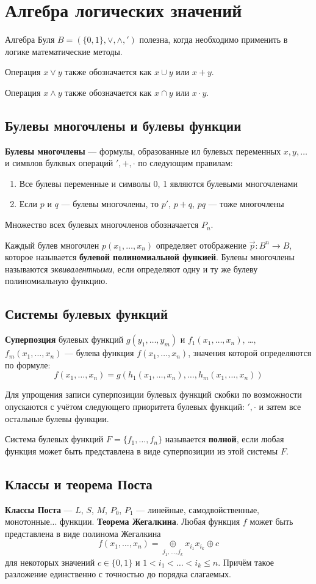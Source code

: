 \section{Алгебра логических значений}
Алгебра Буля $B = (\{0, 1\}, \lor, \land, ')$ полезна, когда необходимо применить в логике математические методы.

Операция $x \lor y$ также обозначается как $x \cup y$ или $x + y$.

Операция $x \land y$ также обозначается как $x \cap y$ или $x \cdot y$.

\subsection{Булевы многочлены и булевы функции}
\dftion \textbf{Булевы многочлены} --- формулы, образованные ил булевых переменных $x, y, \dots$ и симвлов булквых операций $', +, \cdot$ по следующим правилам:
\begin{enumerate}
    \item Все булевы переменные и символы 0, 1 являются булевыми многочленами
    \item Если $p$ и $q$ --- булевы многочлены, то $p'$, $p+q$, $pq$ --- тоже многочлены
\end{enumerate}
Множество всех булевых многочленов обозначается $P_n$.

\dftion Каждый булев многочлен $p(x_1, \dots, x_n)$ определяет отображение $\vec p : B^n \to B$, которое называется \textbf{булевой полиномиальной функией}. Булевы многочлены называются \textit{эквивалентными}, если определяют одну и ту же булеву полиномиальную функцию.
\subsection{Системы булевых функций}
\dftion \textbf{Суперпозция} булевых функций $g(y_1, \dots, y_m)$ и $f_1(x_1, \dots, x_n)$, \dots, $f_m(x_1, \dots, x_n)$ --- булева функция $f(x_1, \dots, x_n)$, значения которой определяются по формуле:
$$f(x_1, \dots, x_n) = g(h_1(x_1, \dots, x_n), \dots, h_m(x_1, \dots, x_n))$$

Для упрощения записи суперпозиции булевых функций скобки по возможности опускаются с учётом следующего приоритета булевых функций: $', \cdot$ и затем все остальные булевы функции.

\dftion Система булевых функций $F = \{f_1, \dots, f_n\}$ называется \textbf{полной}, если любая функция может быть представлена в виде суперпозиции из этой системы $F$.
\subsection{Классы и теорема Поста}
\dftion \textbf{Классы Поста} --- $L$, $S$, $M$, $P_0$, $P_1$ --- линейные, самодвойственные, монотонные... функции.
\dftion \textbf{Теорема Жегалкина}. Любая функция $f$ может быть представлена в виде полинома Жегалкина
$$f(x_1, \dots, x_n) = \underset{j_1, \dots, j_k} \oplus x_{i_1}x_{i_k} \oplus c$$
для некоторых значений $c \in \{0,1\}$ и $1 < i_1 < \dots < i_k \leq n$. Причём такое разложение единственно с точностью до порядка слагаемых.

